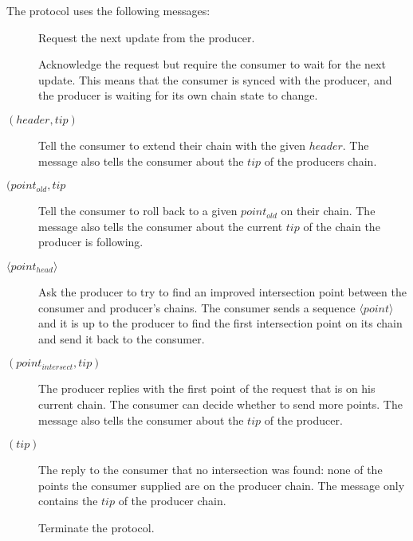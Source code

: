 The protocol uses the following messages:
\begin{description}
\item [\RequestNext]
      Request the next update from the producer.
\item [\AwaitReply]
      Acknowledge the request but require the consumer to wait for the next update.
      This means that the consumer is synced with the producer, and
      the producer is waiting for its own chain state to change.
\item [\RollForward{} {\boldmath $(header, tip)$}]
      Tell the consumer to extend their chain with the given $header$.
      The message also tells the consumer about the $tip$ of the producers chain.
\item [\RollBackward{} {\boldmath $(point_{old}, tip$}]
      Tell the consumer to roll back to a given $point_{old}$ on their chain.
      The message also tells the consumer about the current  $tip$ of the chain the producer is following.
\item [\FindIntersect{} {\boldmath $\langle point_{head} \rangle $}]
      Ask the producer to try to find an improved intersection point between
      the consumer and producer's chains.
      The consumer sends a sequence {\boldmath $\langle point \rangle $}
      and it is up to the producer
      to find the first intersection point on its chain and send it back to the consumer.
\item [\IntersectFound{} {\boldmath $(point_{intersect} ,tip)$}]
      The producer replies with the first point of the request that is on his current chain.
      The consumer can decide whether to send more points.
      The message also tells the consumer about the $tip$ of the producer.
\item [\IntersectNotFound{} {\boldmath $(tip)$}]
      The reply to the consumer that no intersection was found: none of the
      points the consumer supplied are on the producer chain.
      The message only contains the $tip$ of the producer chain.
\item [\MsgDone]
      Terminate the protocol.
\end{description}

